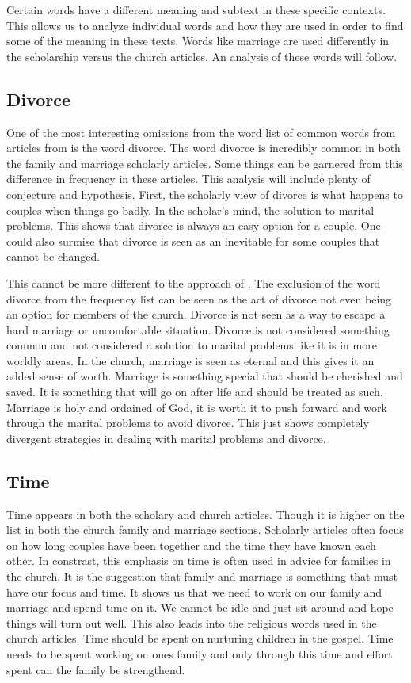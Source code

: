 \documentclass[twocolumn]{article}
\begin{document}
Certain words have a different meaning and subtext in these specific contexts. This allows us to analyze individual words and how they are used in order to find some of the meaning in these texts. Words like marriage are used differently in the scholarship versus the church articles. An analysis of these words will follow.
\subsection{Divorce}

One of the most interesting omissions from the word list of common words from articles from \church is the word divorce. The word divorce is incredibly common in both the family and marriage scholarly articles. Some things can be garnered from this difference in frequency in these articles. This analysis will include plenty of conjecture and hypothesis. First, the scholarly view of divorce is what happens to couples when things go badly. In the scholar's mind, the solution to marital problems. This shows that divorce is always an easy option for a couple. One could also surmise that divorce is seen as an inevitable for some couples that cannot be changed.

This cannot be more different to the approach of \church. The exclusion of the word divorce from the frequency list can be seen as the act of divorce not even being an option for members of the church. Divorce is not seen as a way to escape a hard marriage or uncomfortable situation. Divorce is not considered something common and not considered a solution to marital problems like it is in more worldly areas. In the church, marriage is seen as eternal and this gives it an added sense of worth. Marriage is something special that should be cherished and saved. It is something that will go on after life and should be treated as such. Marriage is holy and ordained of God, it is worth it to push forward and work through the marital problems to avoid divorce. This just shows completely divergent strategies in dealing with marital problems and divorce.

\subsection{Time}

Time appears in both the scholary and church articles. Though it is higher on the list in both the church family and marriage sections. Scholarly articles often focus on how long couples have been together and the time they have known each other. In constrast, this emphasis on time is often used in advice for families in the church. It is the suggestion that family and marriage is something that must have our focus and time. It shows us that we need to work on our family and marriage and spend time on it. We cannot be idle and just sit around and hope things will turn out well. This also leads into the religious words used in the church articles. Time should be spent on nurturing children in the gospel. Time needs to be spent working on ones family and only through this time and effort spent can the family be strengthend.
\end{document}
